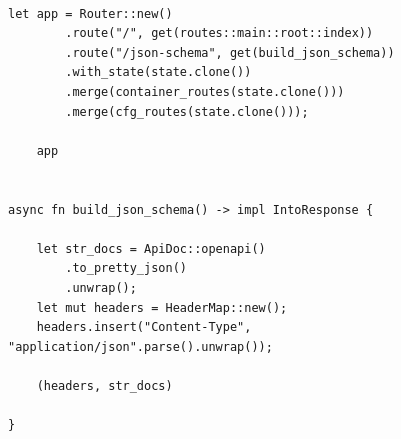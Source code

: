 \begin{verbatim}

let app = Router::new()
        .route("/", get(routes::main::root::index))
        .route("/json-schema", get(build_json_schema))
        .with_state(state.clone())
        .merge(container_routes(state.clone()))
        .merge(cfg_routes(state.clone()));

    app


async fn build_json_schema() -> impl IntoResponse {

    let str_docs = ApiDoc::openapi()
        .to_pretty_json()
        .unwrap();
    let mut headers = HeaderMap::new();
    headers.insert("Content-Type", "application/json".parse().unwrap());

    (headers, str_docs)

}

\end{verbatim}

